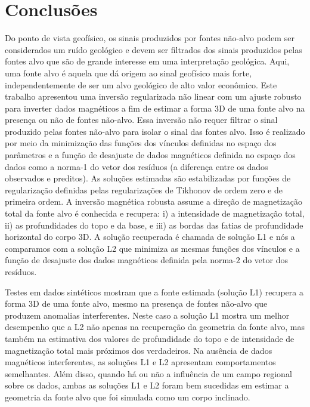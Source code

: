 \chapter{Conclusões}


Do ponto de vista geofísico, os sinais produzidos por fontes não-alvo podem ser considerados um ruído geológico e devem ser filtrados dos sinais produzidos pelas fontes alvo que são de grande interesse em uma interpretação geológica.
Aqui, uma fonte alvo é aquela que dá origem ao sinal geofísico mais forte, independentemente de ser um alvo geológico de alto valor econômico.
Este trabalho apresentou uma inversão regularizada não linear com um ajuste robusto para inverter dados magnéticos a fim de estimar a forma 3D de uma fonte alvo na presença ou não de fontes não-alvo.
Essa inversão não requer filtrar o sinal produzido pelas fontes não-alvo para isolar o sinal das fontes alvo.
Isso é realizado por meio da minimização das funções dos vínculos definidas no espaço dos parâmetros e a função de desajuste de dados magnéticos definida no espaço dos dados como a norma-1 do vetor dos resíduos (a diferença entre os dados observados e preditos).
As soluções estimadas são estabilizadas por funções de regularização definidas pelas regularizações de Tikhonov de ordem zero e de primeira ordem.
A inversão magnética robusta assume a direção de magnetização total da fonte alvo é conhecida e recupera: i) a intensidade de magnetização total, ii) as profundidades do topo e da base, e iii) as bordas das fatias de profundidade horizontal do corpo 3D.
A solução recuperada é chamada de solução L1 e nós a comparamos com a solução L2 que minimiza as mesmas funções dos vínculos e a função de desajuste dos dados magnéticos definida pela norma-$2$ do vetor dos resíduos.

Testes em dados sintéticos mostram que a fonte estimada (solução L1) recupera a forma 3D de uma fonte alvo, mesmo na presença de fontes não-alvo que produzem anomalias interferentes.
Neste caso a solução L1 mostra um melhor desempenho que a L2 não apenas na recuperação da geometria da fonte alvo, mas também na estimativa dos valores de profundidade do topo e de intensidade de magnetização total mais próximos dos verdadeiros.
Na ausência de dados magnéticos interferentes, as soluções L1 e L2 apresentam comportamentos semelhantes.
Além disso, quando há ou não a influência de um campo regional sobre os dados, ambas as soluções L1 e L2 foram bem sucedidas em estimar a geometria da fonte alvo que foi simulada como um corpo inclinado.

